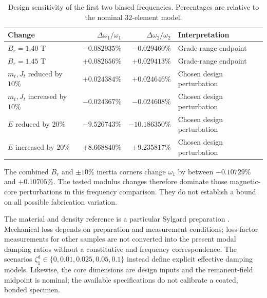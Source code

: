 \begin{table}[t]
\centering\small
\caption{Design sensitivity of the first two biased frequencies.
Percentages are relative to the nominal $32$-element model.}
\label{sm:sensitivity-table}
\begin{tabular}{lrrl}
\toprule
Change & $\Delta\omega_1/\omega_1$ & $\Delta\omega_2/\omega_2$ & Interpretation\\
\midrule
$B_r=1.40$ T & $-0.082935\%$ & $-0.029460\%$ & Grade-range endpoint\\
$B_r=1.45$ T & $+0.082656\%$ & $+0.029413\%$ & Grade-range endpoint\\
$m_t,J_t$ reduced by $10\%$ & $+0.024384\%$ & $+0.024646\%$ & Chosen design perturbation\\
$m_t,J_t$ increased by $10\%$ & $-0.024367\%$ & $-0.024608\%$ & Chosen design perturbation\\
$E$ reduced by $20\%$ & $-9.526743\%$ & $-10.186350\%$ & Chosen design perturbation\\
$E$ increased by $20\%$ & $+8.668840\%$ & $+9.235817\%$ & Chosen design perturbation\\
\bottomrule
\end{tabular}
\end{table}

The combined $B_r$ and $\pm10\%$ inertia corners change $\omega_1$ by
between $-0.10729\%$ and $+0.10705\%$. The tested modulus changes
therefore dominate those magnetic-core perturbations in this frequency
comparison. They do not establish a bound on all possible fabrication
variation.

The material and density reference is a particular Sylgard preparation
\citep{cho2021pdms}. Mechanical loss depends on preparation and
measurement conditions; loss-factor measurements for other samples
\citep{fischer2017adhesion} are not converted into the present modal
damping ratios without a constitutive and frequency correspondence.
The scenarios $\zeta_1^{\mathrm{d}}\in\{0,0.01,0.025,0.05,0.1\}$ instead define
explicit effective damping models. Likewise, the core dimensions are
design inputs and the remanent-field midpoint is nominal; the
available specifications do not calibrate a coated, bonded specimen.


